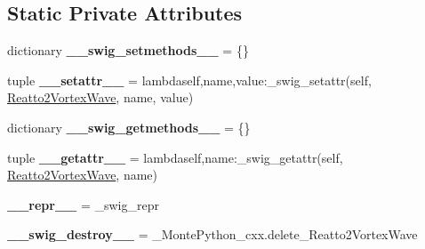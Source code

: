 \subsection*{Static Private Attributes}
\begin{DoxyCompactItemize}
\item 
\hypertarget{classMontePython__cxx_1_1Reatto2VortexWave_acc823f86a8270c199dd58526a772ca03}{}dictionary {\bfseries \+\_\+\+\_\+swig\+\_\+setmethods\+\_\+\+\_\+} = \{\}\label{classMontePython__cxx_1_1Reatto2VortexWave_acc823f86a8270c199dd58526a772ca03}

\item 
\hypertarget{classMontePython__cxx_1_1Reatto2VortexWave_a64056b5efe9adc3c74dff34b32fb1d84}{}tuple {\bfseries \+\_\+\+\_\+setattr\+\_\+\+\_\+} = lambdaself,name,value\+:\+\_\+swig\+\_\+setattr(self, \hyperlink{classMontePython__cxx_1_1Reatto2VortexWave}{Reatto2\+Vortex\+Wave}, name, value)\label{classMontePython__cxx_1_1Reatto2VortexWave_a64056b5efe9adc3c74dff34b32fb1d84}

\item 
\hypertarget{classMontePython__cxx_1_1Reatto2VortexWave_a46b61271ac23f06ec5ce2e50c3381871}{}dictionary {\bfseries \+\_\+\+\_\+swig\+\_\+getmethods\+\_\+\+\_\+} = \{\}\label{classMontePython__cxx_1_1Reatto2VortexWave_a46b61271ac23f06ec5ce2e50c3381871}

\item 
\hypertarget{classMontePython__cxx_1_1Reatto2VortexWave_a4f8369c9d21da075f1c5813f2b856e01}{}tuple {\bfseries \+\_\+\+\_\+getattr\+\_\+\+\_\+} = lambdaself,name\+:\+\_\+swig\+\_\+getattr(self, \hyperlink{classMontePython__cxx_1_1Reatto2VortexWave}{Reatto2\+Vortex\+Wave}, name)\label{classMontePython__cxx_1_1Reatto2VortexWave_a4f8369c9d21da075f1c5813f2b856e01}

\item 
\hypertarget{classMontePython__cxx_1_1Reatto2VortexWave_a9899252de068b2f5ed38d843ec407575}{}{\bfseries \+\_\+\+\_\+repr\+\_\+\+\_\+} = \+\_\+swig\+\_\+repr\label{classMontePython__cxx_1_1Reatto2VortexWave_a9899252de068b2f5ed38d843ec407575}

\item 
\hypertarget{classMontePython__cxx_1_1Reatto2VortexWave_a5dfbd2e11a238d405c4bd637e210efec}{}{\bfseries \+\_\+\+\_\+swig\+\_\+destroy\+\_\+\+\_\+} = \+\_\+\+Monte\+Python\+\_\+cxx.\+delete\+\_\+\+Reatto2\+Vortex\+Wave\label{classMontePython__cxx_1_1Reatto2VortexWave_a5dfbd2e11a238d405c4bd637e210efec}

\end{DoxyCompactItemize}


